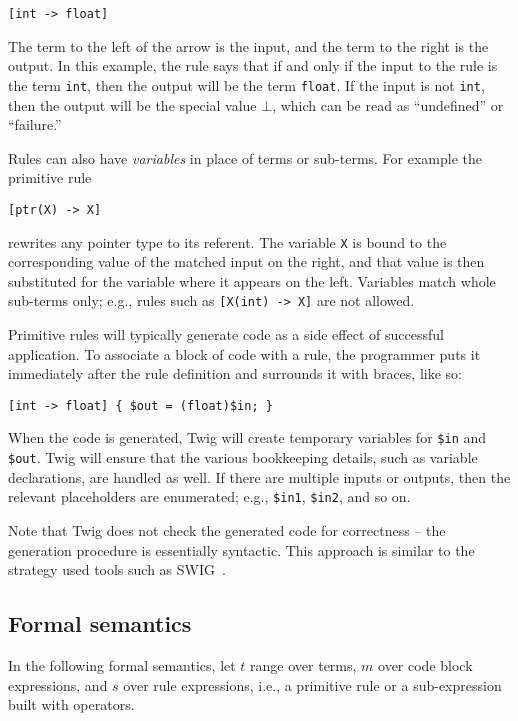 \begin{verbatim}
[int -> float]
\end{verbatim}

The term to the left of the arrow is the input, and the term to the right is the output. In this example, the rule says that if and only if the input to the rule is the term \texttt{int}, then the output will be the term \texttt{float}. If the input is not \texttt{int}, then the output will be the special value $\bot$, which can be read as ``undefined'' or ``failure.''

Rules can also have \emph{variables} in place of terms or sub-terms. For example the primitive rule

\begin{verbatim}
[ptr(X) -> X]
\end{verbatim}

rewrites any pointer type to its referent. The variable \texttt{X} is bound to the corresponding value of the matched input on the right, and that value is then substituted for the variable where it appears on the left. Variables match whole sub-terms only; e.g., rules such as \texttt{[X(int) -> X]} are not allowed.

Primitive rules will typically generate code as a side effect of successful application. To associate a block of code with a rule, the programmer puts it immediately after the rule definition and surrounds it with braces, like so:

\begin{verbatim}
[int -> float] { $out = (float)$in; }
\end{verbatim}

When the code is generated, Twig will create temporary variables for \texttt{\$in} and \texttt{\$out}. Twig will ensure that the various bookkeeping details, such as variable declarations, are handled as well. If there are multiple inputs or outputs, then the relevant placeholders are enumerated; e.g., \texttt{\$in1}, \texttt{\$in2}, and so on.

Note that Twig does not check the generated code for correctness  -- the generation procedure is essentially syntactic. This approach is similar to the strategy used tools such as SWIG~\cite{swig}.

\subsection{Formal semantics}

In the following formal semantics, let $t$ range over terms, $m$ over code block expressions, and $s$ over rule expressions, i.e., a primitive rule or a sub-expression built with operators.

